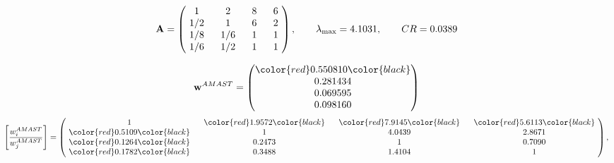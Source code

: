 \begin{example}
\begin{equation*}
\mathbf{A} =
\begin{pmatrix}
$\,\,$ 1 $\,\,$ & $\,\,$2$\,\,$ & $\,\,$8$\,\,$ & $\,\,$6 $\,\,$ \\
$\,\,$ 1/2$\,\,$ & $\,\,$ 1 $\,\,$ & $\,\,$6$\,\,$ & $\,\,$2 $\,\,$ \\
$\,\,$ 1/8$\,\,$ & $\,\,$ 1/6$\,\,$ & $\,\,$ 1 $\,\,$ & $\,\,$1 $\,\,$ \\
$\,\,$ 1/6$\,\,$ & $\,\,$ 1/2$\,\,$ & $\,\,$ 1 $\,\,$ & $\,\,$ 1  $\,\,$ \\
\end{pmatrix},
\qquad
\lambda_{\max} =
4.1031,
\qquad
CR = 0.0389
\end{equation*}

\begin{equation*}
\mathbf{w}^{AMAST} =
\begin{pmatrix}
\color{red} 0.550810\color{black} \\
0.281434\\
0.069595\\
0.098160
\end{pmatrix}\end{equation*}
\begin{equation*}
\left[ \frac{{w}^{AMAST}_i}{{w}^{AMAST}_j} \right] =
\begin{pmatrix}
$\,\,$ 1 $\,\,$ & $\,\,$\color{red} 1.9572\color{black} $\,\,$ & $\,\,$\color{red} 7.9145\color{black} $\,\,$ & $\,\,$\color{red} 5.6113\color{black} $\,\,$ \\
$\,\,$\color{red} 0.5109\color{black} $\,\,$ & $\,\,$ 1 $\,\,$ & $\,\,$4.0439$\,\,$ & $\,\,$2.8671  $\,\,$ \\
$\,\,$\color{red} 0.1264\color{black} $\,\,$ & $\,\,$0.2473$\,\,$ & $\,\,$ 1 $\,\,$ & $\,\,$0.7090 $\,\,$ \\
$\,\,$\color{red} 0.1782\color{black} $\,\,$ & $\,\,$0.3488$\,\,$ & $\,\,$1.4104$\,\,$ & $\,\,$ 1  $\,\,$ \\
\end{pmatrix},
\end{equation*}


\end{example}
